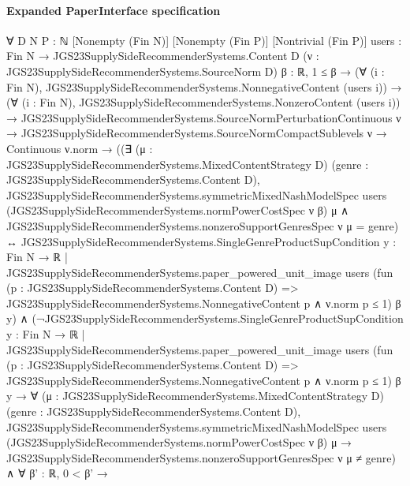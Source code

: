 \documentclass[10pt]{article}
\begin{document}
\paragraph{Expanded PaperInterface specification}
\begin{ReviewVerbatim}
∀ {D N P : ℕ} [Nonempty (Fin N)] [Nonempty (Fin P)] [Nontrivial (Fin P)]
  {users : Fin N → JGS23SupplySideRecommenderSystems.Content D} (ν : JGS23SupplySideRecommenderSystems.SourceNorm D)
  {β : ℝ},
  1 ≤ β →
    (∀ (i : Fin N), JGS23SupplySideRecommenderSystems.NonnegativeContent (users i)) →
      (∀ (i : Fin N), JGS23SupplySideRecommenderSystems.NonzeroContent (users i)) →
        JGS23SupplySideRecommenderSystems.SourceNormPerturbationContinuous ν →
          JGS23SupplySideRecommenderSystems.SourceNormCompactSublevels ν →
            Continuous ν.norm →
              ((∃ (μ : JGS23SupplySideRecommenderSystems.MixedContentStrategy D) (genre :
                    JGS23SupplySideRecommenderSystems.Content D),
                    JGS23SupplySideRecommenderSystems.symmetricMixedNashModelSpec users
                        (JGS23SupplySideRecommenderSystems.normPowerCostSpec ν β) μ ∧
                      JGS23SupplySideRecommenderSystems.nonzeroSupportGenresSpec ν μ = {genre}) ↔
                  JGS23SupplySideRecommenderSystems.SingleGenreProductSupCondition
                    {y : Fin N → ℝ |
                      JGS23SupplySideRecommenderSystems.paper_powered_unit_image users
                        (fun (p : JGS23SupplySideRecommenderSystems.Content D) =>
                          JGS23SupplySideRecommenderSystems.NonnegativeContent p ∧ ν.norm p ≤ 1)
                        β y}) ∧
                (¬JGS23SupplySideRecommenderSystems.SingleGenreProductSupCondition
                        {y : Fin N → ℝ |
                          JGS23SupplySideRecommenderSystems.paper_powered_unit_image users
                            (fun (p : JGS23SupplySideRecommenderSystems.Content D) =>
                              JGS23SupplySideRecommenderSystems.NonnegativeContent p ∧ ν.norm p ≤ 1)
                            β y} →
                    ∀ (μ : JGS23SupplySideRecommenderSystems.MixedContentStrategy D)
                      (genre : JGS23SupplySideRecommenderSystems.Content D),
                      JGS23SupplySideRecommenderSystems.symmetricMixedNashModelSpec users
                          (JGS23SupplySideRecommenderSystems.normPowerCostSpec ν β) μ →
                        JGS23SupplySideRecommenderSystems.nonzeroSupportGenresSpec ν μ ≠ {genre}) ∧
                  ∀ {β' : ℝ},
                    0 < β' →

\end{ReviewVerbatim}
\end{document}
